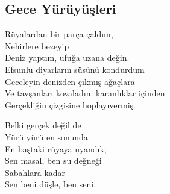 \subsection{Gece Yürüyüşleri}

Rüyalardan bir parça çaldım, \\
Nehirlere bezeyip \\
Deniz yaptım, ufuğa uzana değin. \\
Efsunlu diyarların süsünü kondurdum \\
Geceleyin denizden çıkmış ağaçlara \\
Ve tavşanları kovaladım karanlıklar içinden \\
Gerçekliğin çizgisine hoplayıvermiş.

\noindent\newline
Belki gerçek değil de \\
Yürü yürü en sonunda \\
En baştaki rüyaya uyandık; \\
Sen masal, ben su değneği \\
Sabahlara kadar \\
Sen beni düşle, ben seni.